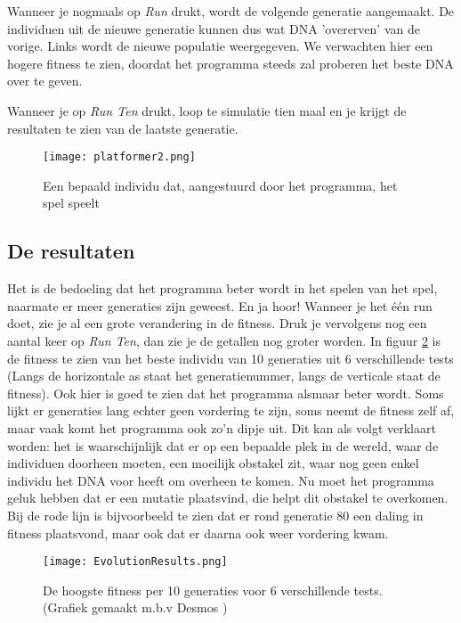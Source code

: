 Wanneer je nogmaals op \textit{Run} drukt, wordt de volgende generatie aangemaakt. De individuen uit de nieuwe generatie kunnen dus wat DNA 'overerven' van de vorige. Links wordt de nieuwe populatie weergegeven. We verwachten hier een hogere fitness te zien, doordat het programma steeds zal proberen het beste DNA over te geven.

Wanneer je op \textit{Run Ten} drukt, loop te simulatie tien maal en je krijgt de resultaten te zien van de laatste generatie.


\begin{figure}[h]
  \centering
    \texttt{[image: platformer2.png]}
  \caption{Een bepaald individu dat, aangestuurd door het programma, het spel speelt}
  \label{fig:platformer1}
\end{figure}

\subsection{De resultaten}
Het is de bedoeling dat het programma beter wordt in het spelen van het spel, naarmate er meer generaties zijn geweest. En ja hoor! Wanneer je het één run doet, zie je al een grote verandering in de fitness. Druk je vervolgens nog een aantal keer op \textit{Run Ten}, dan zie je de getallen nog groter worden. In figuur \ref{fig:EvolutionResults} is de fitness te zien van het beste individu van 10 generaties uit 6 verschillende tests (Langs de horizontale as staat het generatienummer, langs de verticale staat de fitness). Ook hier is goed te zien dat het programma alsmaar beter wordt. Soms lijkt er generaties lang echter geen vordering te zijn, soms neemt de fitness zelf af, maar vaak komt het programma ook zo'n dipje uit. Dit kan als volgt verklaart worden: het is waarschijnlijk dat er op een bepaalde plek in de wereld, waar de individuen doorheen moeten, een moeilijk obstakel zit, waar nog geen enkel individu het DNA voor heeft om overheen te komen. Nu moet het programma geluk hebben dat er een mutatie plaatsvind, die helpt dit obstakel te overkomen. Bij de rode lijn is bijvoorbeeld te zien dat er rond generatie 80 een daling in fitness plaatsvond, maar ook dat er daarna ook weer vordering kwam.

\begin{figure}[h]
  \centering
    \texttt{[image: EvolutionResults.png]}
  \caption{De hoogste fitness per 10 generaties voor 6 verschillende tests. (Grafiek gemaakt m.b.v Desmos \cite{Desmos})}
  \label{fig:EvolutionResults}
\end{figure}

